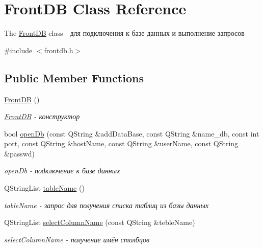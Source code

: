 \hypertarget{classFrontDB}{}\section{Front\+DB Class Reference}
\label{classFrontDB}


The \hyperlink{classFrontDB}{Front\+DB} class -\/ для подключения к базе данных и выполнение запросов  




{\ttfamily \#include $<$frontdb.\+h$>$}

\subsection*{Public Member Functions}
\begin{DoxyCompactItemize}
\item 
\mbox{\label{classFrontDB_a1c9f83345d27143eb06c8f530ee755d6}} 
\hyperlink{classFrontDB_a1c9f83345d27143eb06c8f530ee755d6}{Front\+DB} ()
\begin{DoxyCompactList}\small\item\em \hyperlink{classFrontDB}{Front\+DB} -\/ конструктор \end{DoxyCompactList}\item 
bool \hyperlink{classFrontDB_a70a99620d0c21f2ac0af229218d4f0f2}{open\+Db} (const Q\+String \&add\+Data\+Base, const Q\+String \&name\+\_\+db, const int port, const Q\+String \&host\+Name, const Q\+String \&user\+Name, const Q\+String \&passwd)
\begin{DoxyCompactList}\small\item\em open\+Db -\/ подключение к базе данных \end{DoxyCompactList}\item 
Q\+String\+List \hyperlink{classFrontDB_aa5cc2999b6731290015b11908b58d8da}{table\+Name} ()
\begin{DoxyCompactList}\small\item\em table\+Name -\/ запрос для получения списка таблиц из базы данных \end{DoxyCompactList}\item 
Q\+String\+List \hyperlink{classFrontDB_a6245bace114b88f4cb29bf7c6b7da9f9}{select\+Column\+Name} (const Q\+String \&teble\+Name)
\begin{DoxyCompactList}\small\item\em select\+Column\+Name -\/ получение имён столбцов \end{DoxyCompactList}\item 

\end{DoxyCompactItemize}

